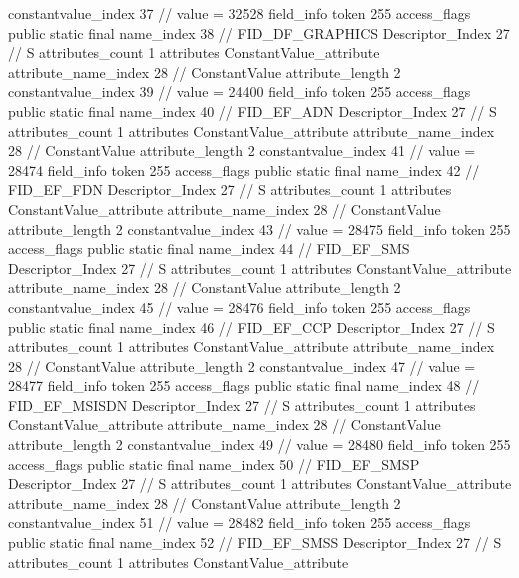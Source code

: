 {{{{{{{					constantvalue_index	37		// value = 32528
				}
				}
			}
			field_info {
				token	255
				access_flags	public static final
				name_index	38		// FID_DF_GRAPHICS
				Descriptor_Index	27		// S
				attributes_count	1
				attributes {
				ConstantValue_attribute {
					attribute_name_index	28		// ConstantValue
					attribute_length	2
					constantvalue_index	39		// value = 24400
				}
				}
			}
			field_info {
				token	255
				access_flags	public static final
				name_index	40		// FID_EF_ADN
				Descriptor_Index	27		// S
				attributes_count	1
				attributes {
				ConstantValue_attribute {
					attribute_name_index	28		// ConstantValue
					attribute_length	2
					constantvalue_index	41		// value = 28474
				}
				}
			}
			field_info {
				token	255
				access_flags	public static final
				name_index	42		// FID_EF_FDN
				Descriptor_Index	27		// S
				attributes_count	1
				attributes {
				ConstantValue_attribute {
					attribute_name_index	28		// ConstantValue
					attribute_length	2
					constantvalue_index	43		// value = 28475
				}
				}
			}
			field_info {
				token	255
				access_flags	public static final
				name_index	44		// FID_EF_SMS
				Descriptor_Index	27		// S
				attributes_count	1
				attributes {
				ConstantValue_attribute {
					attribute_name_index	28		// ConstantValue
					attribute_length	2
					constantvalue_index	45		// value = 28476
				}
				}
			}
			field_info {
				token	255
				access_flags	public static final
				name_index	46		// FID_EF_CCP
				Descriptor_Index	27		// S
				attributes_count	1
				attributes {
				ConstantValue_attribute {
					attribute_name_index	28		// ConstantValue
					attribute_length	2
					constantvalue_index	47		// value = 28477
				}
				}
			}
			field_info {
				token	255
				access_flags	public static final
				name_index	48		// FID_EF_MSISDN
				Descriptor_Index	27		// S
				attributes_count	1
				attributes {
				ConstantValue_attribute {
					attribute_name_index	28		// ConstantValue
					attribute_length	2
					constantvalue_index	49		// value = 28480
				}
				}
			}
			field_info {
				token	255
				access_flags	public static final
				name_index	50		// FID_EF_SMSP
				Descriptor_Index	27		// S
				attributes_count	1
				attributes {
				ConstantValue_attribute {
					attribute_name_index	28		// ConstantValue
					attribute_length	2
					constantvalue_index	51		// value = 28482
				}
				}
			}
			field_info {
				token	255
				access_flags	public static final
				name_index	52		// FID_EF_SMSS
				Descriptor_Index	27		// S
				attributes_count	1
				attributes {
				ConstantValue_attribute {
}}}}}}}
